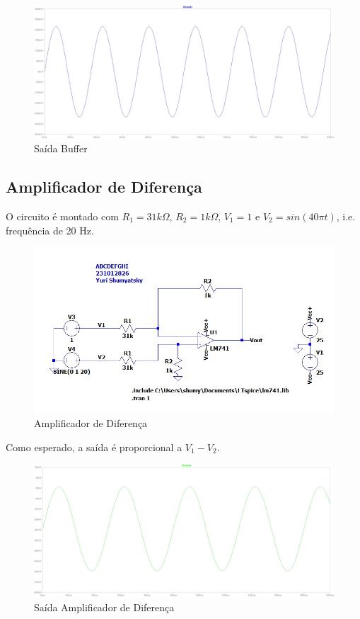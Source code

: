 \documentclass[10pt,twocolumn,letterpaper]{article}
\begin{document}
\begin{figure}[h]
\caption{Saída Buffer}
\begin{center}
\includegraphics[scale=0.15]{figuras/fig14}
\end{center}
\end{figure}

\subsection{Amplificador de Diferença}

O circuito é montado com $R_1=31k\Omega$, $R_2=1k\Omega$, $V_1=1$ e $V_2=sin(40\pi t)$, i.e. frequência de 20 Hz.

\begin{figure}[h]
\caption{Amplificador de Diferença}
\begin{center}
\includegraphics[scale=0.2]{figuras/fig15}
\end{center}
\end{figure}

Como esperado, a saída é proporcional a $V_1-V_2$.

\begin{figure}[h]
\caption{Saída Amplificador de Diferença}
\begin{center}
\includegraphics[scale=0.15]{figuras/fig16}
\end{center}
\end{figure}
\end{document}
